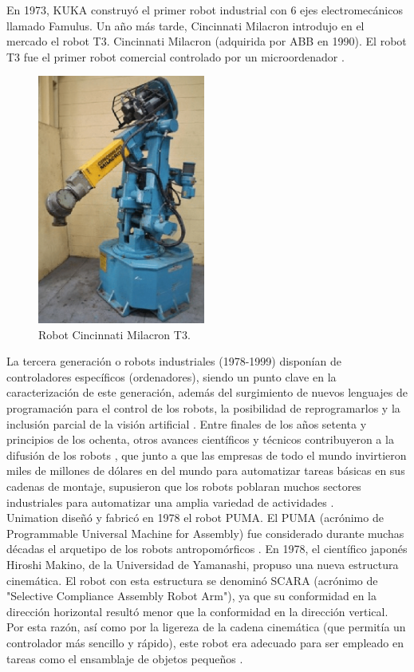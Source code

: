 En 1973, KUKA construyó el primer robot industrial con 6 ejes electromecánicos llamado Famulus. Un año más tarde, Cincinnati Milacron introdujo en el mercado el robot T3. Cincinnati Milacron (adquirida por ABB en 1990). El robot T3 fue el primer robot comercial controlado por un microordenador \cite{Zamalloa17}.
  
  \begin{figure} [h!]
    \begin{center}
      \includegraphics[width=55mm]{figs/T3_robot.png}
    \end{center}
    \caption{Robot Cincinnati Milacron T3.}
    \label{fig:T3}
  \end{figure}
  
  \pagebreak
  
La tercera generación o robots industriales (1978-1999) disponían de controladores específicos (ordenadores), siendo un punto clave en la caracterización de este generación, además del surgimiento de nuevos lenguajes de programación para el control de los robots, la posibilidad de reprogramarlos y la inclusión parcial de la visión artificial \cite{Zamalloa17}. Entre finales de los años setenta y principios de los ochenta, otros avances científicos y técnicos contribuyeron a la difusión de los robots \cite{Gasparetto19}, que junto a que las empresas de todo el mundo invirtieron miles de millones de dólares en del mundo para automatizar tareas básicas en sus cadenas de montaje, supusieron que los robots poblaran muchos sectores industriales para automatizar una amplia variedad de actividades \cite{Zamalloa17}.\\ 

Unimation diseñó y fabricó en 1978 el robot PUMA. El PUMA (acrónimo de Programmable Universal Machine for Assembly) fue considerado durante muchas décadas el arquetipo de los robots antropomórficos \cite{Gasparetto19}. En 1978, el científico japonés Hiroshi Makino, de la Universidad de Yamanashi, propuso una nueva estructura cinemática. El robot con esta estructura se denominó SCARA (acrónimo de "Selective Compliance Assembly Robot Arm"), ya que su conformidad en la dirección horizontal resultó menor que la conformidad en la dirección vertical. Por esta razón, así como por la ligereza de la cadena cinemática (que permitía un controlador más sencillo y rápido), este robot era adecuado para ser empleado en tareas como el ensamblaje de objetos pequeños \cite{Makino80}.
  
